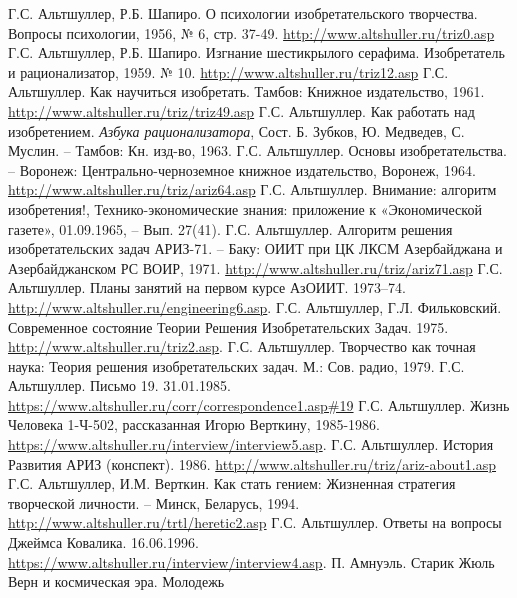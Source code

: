 \begin{thebibliography}{xxx}
 Г.С. Альтшуллер, Р.Б. Шапиро. О психологии
  изобретательского творчества.  Вопросы психологии, 1956, № 6, стр. 37-49.
  \url{http://www.altshuller.ru/triz0.asp}
 Г.С. Альтшуллер, Р.Б. Шапиро. Изгнание шестикрылого
  серафима. Изобретатель и рационализатор, 1959. № 10.
  \url{http://www.altshuller.ru/triz12.asp}
 Г.С. Альтшуллер. Как научиться изобретать. Тамбов:
  Книжное издательство, 1961.  \url{http://www.altshuller.ru/triz/triz49.asp} 
 Г.С. Альтшуллер. Как работать над изобретением.
  \emph{Азбука рационализатора}, Сост. Б. Зубков, Ю. Медведев, С. Муслин. --
  Тамбов: Кн. изд-во, 1963.
 Г.С. Альтшуллер. Основы изобретательства. – Воронеж:
  Центрально-черноземное книжное издательство, Воронеж, 1964.
  \url{http://www.altshuller.ru/triz/ariz64.asp}
 Г.С. Альтшуллер. Внимание: алгоритм изобретения!,
  Технико-экономические знания: приложение к «Экономической газете»,
  01.09.1965, -- Вып. 27(41).
 Г.С. Альтшуллер.  Алгоритм решения изобретательских
  задач АРИЗ-71. – Баку: ОИИТ при ЦК ЛКСМ Азербайджана и Азербайджанском РС
  ВОИР, 1971. \url{http://www.altshuller.ru/triz/ariz71.asp}
 Г.С. Альтшуллер. Планы занятий на первом курсе
  АзОИИТ.  1973--74. \url{http://www.altshuller.ru/engineering6.asp}.
 Г.С. Альтшуллер, Г.Л. Фильковский. Современное
  состояние Теории Решения Изобретательских Задач. 1975.
  \url{http://www.altshuller.ru/triz2.asp}.
 Г.С. Альтшуллер. Творчество как точная наука: Теория
  решения изобретательских задач. М.: Сов. радио, 1979.
 Г.С. Альтшуллер. Письмо 19.  31.01.1985.
  \url{https://www.altshuller.ru/corr/correspondence1.asp#19}
 Г.С. Альтшуллер. Жизнь Человека 1-Ч-502, рассказанная
  Игорю Верткину, 1985-1986.
  \url{https://www.altshuller.ru/interview/interview5.asp}.
 Г.С. Альтшуллер.  История Развития АРИЗ (конспект).
  1986.  \url{http://www.altshuller.ru/triz/ariz-about1.asp}
 Г.С. Альтшуллер, И.М. Верткин. Как стать гением:
  Жизненная стратегия творческой личности. -- Минск, Беларусь, 1994.
  \url{http://www.altshuller.ru/trtl/heretic2.asp}
 Г.С. Альтшуллер. Ответы на вопросы Джеймса Ковалика.
  16.06.1996.  \url{https://www.altshuller.ru/interview/interview4.asp}.
 П. Амнуэль. Старик Жюль Верн и космическая эра. Молодежь

\end{thebibliography}
